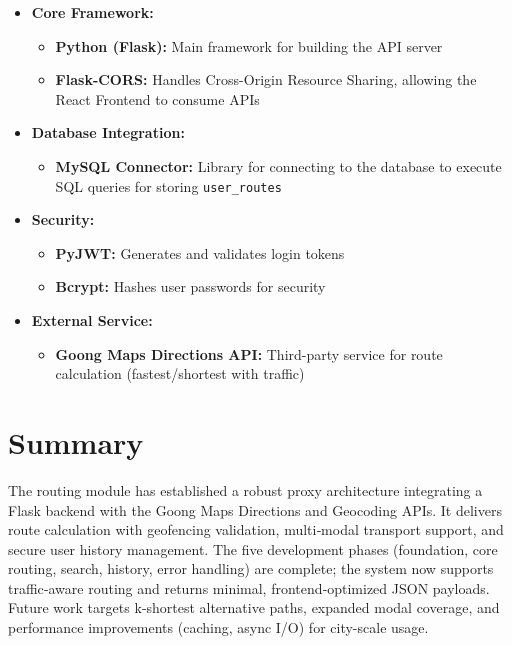 \begin{itemize}
    \item \textbf{Core Framework:}
    \begin{itemize}
        \item \textbf{Python (Flask):} Main framework for building the API server
        \item \textbf{Flask-CORS:} Handles Cross-Origin Resource Sharing, allowing the React Frontend to consume APIs
    \end{itemize}
    
    \item \textbf{Database Integration:}
    \begin{itemize}
        \item \textbf{MySQL Connector:} Library for connecting to the database to execute SQL queries for storing \texttt{user\_routes}
    \end{itemize}
    
    \item \textbf{Security:}
    \begin{itemize}
        \item \textbf{PyJWT:} Generates and validates login tokens
        \item \textbf{Bcrypt:} Hashes user passwords for security
    \end{itemize}
    
    \item \textbf{External Service:}
    \begin{itemize}
        \item \textbf{Goong Maps Directions API:} Third-party service for route calculation (fastest/shortest with traffic)
    \end{itemize}
\end{itemize}



\section{Summary}

The routing module has established a robust proxy architecture integrating a Flask backend with the Goong Maps Directions and Geocoding APIs. It delivers route calculation with geofencing validation, multi‑modal transport support, and secure user history management. The five development phases (foundation, core routing, search, history, error handling) are complete; the system now supports traffic‑aware routing and returns minimal, frontend‑optimized JSON payloads. Future work targets k‑shortest alternative paths, expanded modal coverage, and performance improvements (caching, async I/O) for city-scale usage.
